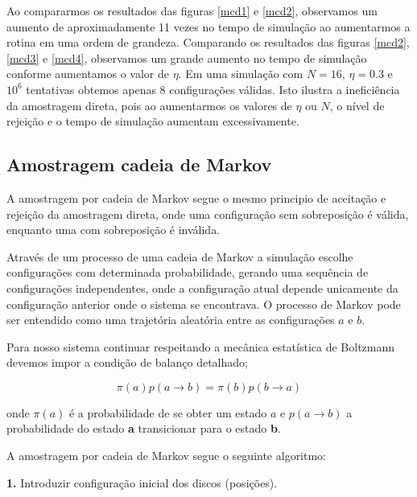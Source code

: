 \documentclass[%
reprint,
amsmath,amssymb,
aps,
12pt
]{revtex4-1}
\begin{document}
Ao compararmos os resultados das figuras \ref{mcd1} e \ref{mcd2}, observamos um aumento de aproximadamente 11 vezes no tempo de simulação ao aumentarmos a rotina em uma ordem de grandeza. Comparando os resultados das figuras \ref{mcd2}, \ref{mcd3} e \ref{mcd4}, observamos um grande aumento no tempo de simulação conforme aumentamos o valor de $ \eta $.
Em uma simulação com $ N = 16 $, $ \eta = 0.3 $ e $ 10^6 $ tentativas obtemos apenas 8 configurações válidas. Isto ilustra a ineficiência da amostragem direta, pois ao aumentarmos os valores de $ \eta $ ou $ N $, o nível de rejeição e o tempo de simulação aumentam excessivamente.









\subsection{Amostragem cadeia de Markov}

A amostragem por cadeia de Markov segue o mesmo principio de aceitação e rejeição da amostragem direta, onde uma configuração sem sobreposição é válida, enquanto uma com sobreposição é inválida. 

Através de um processo de uma cadeia de Markov a simulação escolhe configurações com determinada probabilidade, gerando uma sequência de configurações independentes, onde a configuração atual depende unicamente da configuração anterior onde o sistema se encontrava. O processo de Markov pode ser entendido como uma trajetória aleatória entre as configurações $ a $ e $ b $.

 Para nosso sistema continuar respeitando a mecânica estatística de Boltzmann devemos impor a condição de balanço detalhado;

\begin{equation}
\pi(a)p(a \longrightarrow b)=\pi(b)p(b \longrightarrow a)
\end{equation}

onde $ \pi(a) $ é a probabilidade de se obter um estado $ a $ e $ p(a \longrightarrow b) $ a probabilidade do estado \textbf{a} transicionar para o estado \textbf{b}. %

A amostragem por cadeia de Markov segue o seguinte algoritmo:


\textbf{1.} Introduzir configuração inicial dos discos (posições).
\end{document}
